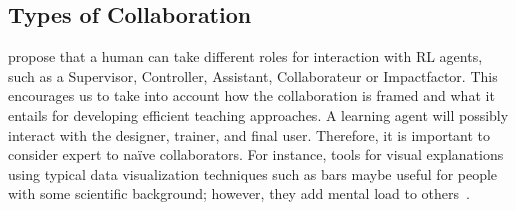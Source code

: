 \documentclass[twoside,11pt]{article}
\begin{document}
\begin{enumerate}


\subsection{Types of Collaboration}

\citet{WuEtAl:2021:HITLMLSurvey} propose that a human can take different roles for interaction with RL agents, such as a Supervisor, Controller, Assistant, Collaborateur or Impactfactor. This encourages us to take into account how the collaboration is framed and what it entails for developing efficient teaching approaches. A learning agent will possibly interact with the designer, trainer, and final user. Therefore, it is important to consider expert to na\"ive collaborators. For instance, tools for visual explanations using typical data visualization techniques such as bars maybe useful for people with some scientific background; however, they add mental load to others~\citep{anderson:20}. 
 

\end{enumerate}
\end{document}
